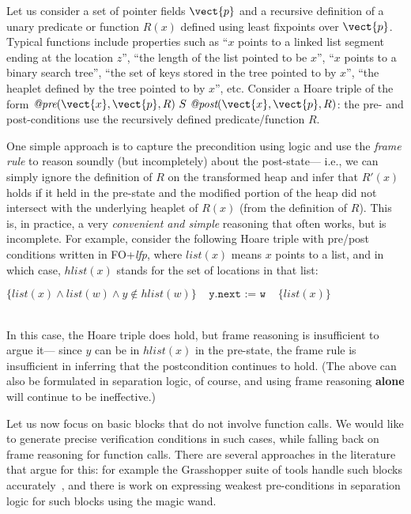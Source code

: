 Let us consider a set of pointer fields $\vect{p}$ and a recursive definition of a unary predicate or function $R(x)$ defined
using least fixpoints over $\vect{p}$. Typical functions include properties such as 
``$x$ points to a linked list segment ending at the location $z$'', ``the length of the list pointed to be $x$'', 
``$x$ points to a binary search tree'', ``the set of keys stored in the tree pointed to by $x$'', ``the heaplet defined
by the tree pointed to by $x$'', etc.
Consider a Hoare triple of the form $\textit{@pre}(\vect{x}, \vect{p}, R) ~S~ \textit{@post}(\vect{x}, \vect{p}, R)$: the pre- and post-conditions use the recursively defined predicate/function $R$.

One simple approach is to capture the precondition using logic and use the \emph{frame rule} to reason soundly
(but incompletely) about the post-state--- i.e., we can simply ignore the definition of $R$
on the transformed heap and infer that $R'(x)$ holds if it held in the pre-state and 
the modified portion of the heap did not intersect with the underlying heaplet of $R(x)$ (from the definition of $R$).
This is, in practice, a very \emph{convenient and simple} reasoning that often works, but is incomplete.
For example, consider the following Hoare triple with pre/post conditions written in FO+\textit{lfp},
where $list(x)$ means $x$ points to a list, and in which
case, $hlist(x)$ stands for the set of locations in that list: \\
\centerline{$ \{ list(x) \wedge  list(w) \wedge  y \not \in hlist(w) \} 
~~~~~\texttt{y.next := w}~~~~~
\{list(x) \}$}\\
\noindent In this case, the Hoare triple does hold, but frame reasoning is insufficient to argue it--- since $y$ can be
in $hlist(x)$ in the pre-state, the frame rule is insufficient in inferring that the postcondition continues to hold. 
(The above can also be formulated in separation logic, of course, and using frame reasoning \textbf{alone} will continue to be
ineffective.)

Let us now focus on basic blocks that do not involve function calls. We would like
to generate precise verification conditions in such cases, while falling back on frame reasoning for function calls. 
There are several approaches in the literature that argue for this: for example the Grasshopper suite of tools
handle such blocks accurately~\cite{PiskacWiesZufferey2014}, and there is work on expressing weakest pre-conditions in separation logic for such blocks using the magic wand.


